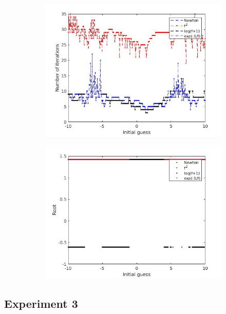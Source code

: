 \documentclass{book}
\begin{document}
\begin{figure}
	\begin{subfigure}{0.5\textwidth}
		\includegraphics[width=\textwidth]{exp2_01.jpg}
	\end{subfigure}
	\begin{subfigure}{0.5\textwidth}
		\includegraphics[width=\textwidth]{exp2_02.jpg}
	\end{subfigure}
\end{figure}

\subsection{Experiment 3}
\end{document}

